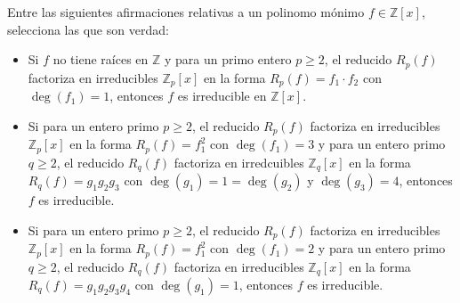 \begin{ejercicio}
    Entre las siguientes afirmaciones relativas a un polinomo mónimo $f\in \mathbb{Z}[x]$, selecciona las que son verdad:
    \begin{itemize}
        \item Si $f$ no tiene raíces en $\mathbb{Z}$ y para un primo entero $p\geq 2$, el reducido $R_p(f)$ factoriza en irreducibles $\mathbb{Z}_p[x]$ en la forma $R_p(f) = f_1 \cdot f_2$ con $\deg(f_1)=1$, entonces $f$ es irreducible en $\mathbb{Z}[x]$.
        \item Si para un entero primo $p\geq 2$, el reducido $R_p(f)$ factoriza en irreducibles $\mathbb{Z}_p[x]$ en la forma $R_p(f) = f_1^2$ con $\deg(f_1)=3$ y para un entero primo $q\geq 2$, el reducido $R_q(f)$ factoriza en irredcuibles $\mathbb{Z}_q[x]$ en la forma $R_q(f)=g_1g_2g_3$ con $\deg(g_1)=1=\deg(g_2)$ y $\deg(g_3)=4$, entonces $f$ es irreducible.
        \item Si para un entero primo $p\geq 2$, el reducido $R_p(f)$ factoriza en irreducibles $\mathbb{Z}_p[x]$ en la forma $R_p(f)=f_1^2$ con $\deg(f_1)=2$ y para un entero primo $q\geq 2$, el reducido $R_q(f)$ factoriza en irreducibles $\mathbb{Z}_q[x]$ en la forma $R_q(f)=g_1g_2g_3g_4$ con $\deg(g_1)=1$, entonces $f$ es irreducible.
    \end{itemize}
\end{ejercicio}

\newpage
\ %
\resetearcontador

